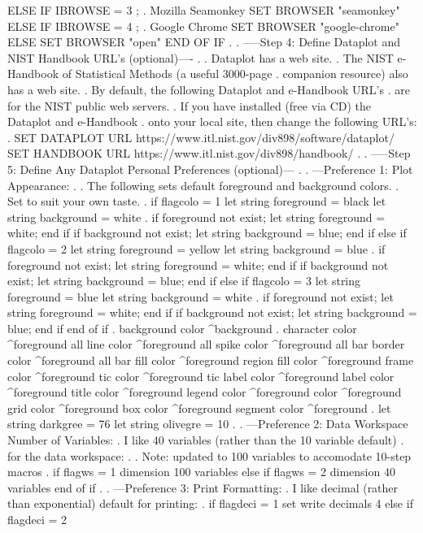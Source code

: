 ELSE IF IBROWSE = 3  ; . Mozilla Seamonkey
   SET BROWSER "seamonkey"
ELSE IF IBROWSE = 4  ; . Google Chrome
   SET BROWSER "google-chrome"
ELSE
   SET BROWSER "open"
END OF IF
.
. -----Step 4: Define Dataplot and NIST Handbook URL's (optional)----
.
.  Dataplot has a web site.
.  The NIST e-Handbook of Statistical Methods (a useful 3000-page
.  companion resource) also has a web site.
.  By default, the following Dataplot and e-Handbook URL's
.  are for the NIST public web servers.
.  If you have installed (free via CD) the Dataplot and e-Handbook
.  onto your local site, then change the following URL's:
.
SET DATAPLOT URL https://www.itl.nist.gov/div898/software/dataplot/
SET HANDBOOK URL https://www.itl.nist.gov/div898/handbook/
.
. -----Step 5: Define Any Dataplot Personal Preferences (optional)---
.
. ---Preference 1: Plot Appearance:
.
.  The following sets default foreground and background colors.
.  Set to suit your own taste.
.
if flagcolo = 1
   let string foreground = black
   let string background = white
   .
   if foreground not exist; let string foreground = white; end if
   if background not exist; let string background = blue; end if
else if flagcolo = 2
   let string foreground = yellow
   let string background = blue
   .
   if foreground not exist; let string foreground = white; end if
   if background not exist; let string background = blue; end if
else if flagcolo = 3
   let string foreground = blue
   let string background = white
   .
   if foreground not exist; let string foreground = white; end if
   if background not exist; let string background = blue; end if
end of if
.
background color ^background
.
character color ^foreground all
line color ^foreground all
spike color ^foreground all
bar border color ^foreground all
bar fill color ^foreground
region fill color ^foreground
frame color ^foreground
tic color ^foreground
tic label color ^foreground
label color ^foreground
title color ^foreground
legend color ^foreground
color ^foreground
grid color ^foreground
box color ^foreground
segment color ^foreground
.
let string darkgree = 76
let string olivegre = 10
.
. ---Preference 2: Data Workspace Number of Variables:
.    I like 40 variables (rather than the 10 variable default)
.    for the data workspace:
.
.    Note: updated to 100 variables to accomodate 10-step macros
.
if flagws = 1
   dimension 100 variables
else if flagws = 2
   dimension 40 variables
end of if
.
. ---Preference 3: Print Formatting:
.    I like decimal (rather than exponential) default for printing:
.
if flagdeci = 1
   set write decimals 4
else if flagdeci = 2
